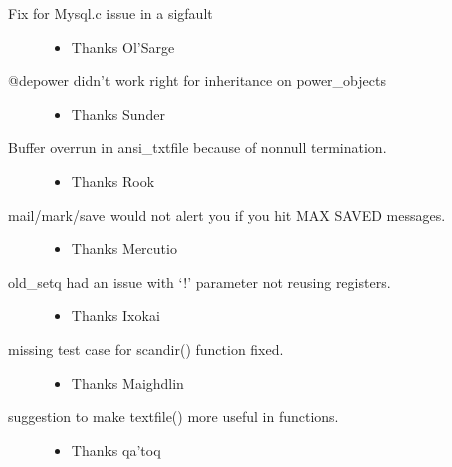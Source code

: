 \documentclass[letterpaper,10pt,english]{sphinxmanual}
\begin{document}
\begin{description}
\item[{Fix for Mysql.c issue in a sigfault}] \leavevmode\begin{itemize}
\item {} 
\sphinxAtStartPar
Thanks Ol’Sarge

\end{itemize}

\item[{@depower didn’t work right for inheritance on power\_objects}] \leavevmode\begin{itemize}
\item {} 
\sphinxAtStartPar
Thanks Sunder

\end{itemize}

\item[{Buffer overrun in ansi\_txtfile because of non\sphinxhyphen{}null termination.}] \leavevmode\begin{itemize}
\item {} 
\sphinxAtStartPar
Thanks Rook

\end{itemize}

\item[{mail/mark/save would not alert you if you hit MAX SAVED messages.}] \leavevmode\begin{itemize}
\item {} 
\sphinxAtStartPar
Thanks Mercutio

\end{itemize}

\item[{old\_setq had an issue with ‘!’ parameter not reusing registers.}] \leavevmode\begin{itemize}
\item {} 
\sphinxAtStartPar
Thanks Ixokai

\end{itemize}

\item[{missing test case for scandir() function fixed.}] \leavevmode\begin{itemize}
\item {} 
\sphinxAtStartPar
Thanks Maighdlin

\end{itemize}

\item[{suggestion to make textfile() more useful in functions.}] \leavevmode\begin{itemize}
\item {} 
\sphinxAtStartPar
Thanks qa’toq


\end{itemize}
\end{description}
\end{document}
